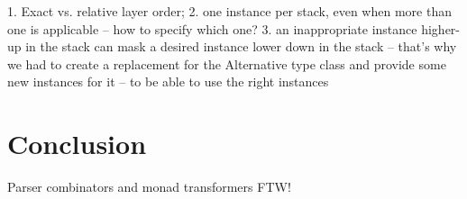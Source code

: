 \documentclass{tmr}
\begin{document}
1. Exact vs. relative layer order; 
2. one instance per stack, even when more than one is applicable --
how to specify which one?
3. an inappropriate instance higher-up in the stack can mask a 
desired instance lower down in the stack -- that's why we had to
create a replacement for the Alternative type class and provide
some new instances for it -- to be able to use the right instances



\section{Conclusion}

Parser combinators and monad transformers FTW!



\end{document}
